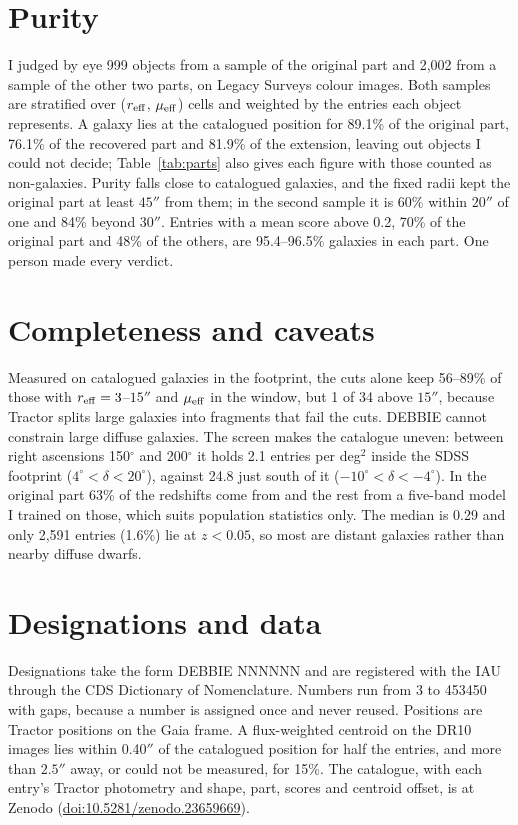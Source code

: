 \documentclass{aastex701}
\begin{document}
\section{Purity}

I judged by eye 999 objects from a sample of the original part and
2,002 from a sample of the other two parts, on Legacy Surveys colour images. Both samples are stratified over
($r_{\rm eff}$, $\mu_{\rm eff}$) cells and weighted by the entries each object
represents. A galaxy lies at the catalogued position for 89.1\% of the
original part, 76.1\% of the recovered part and 81.9\% of the
extension, leaving out objects I could not decide; Table~\ref{tab:parts} also
gives each figure with those counted as non-galaxies. Purity falls close to
catalogued galaxies, and the fixed radii kept the original part at least $45''$
from them; in the second sample it is 60\% within $20''$ of one and
84\% beyond $30''$.
Entries with a mean score above 0.2, 70\% of the original part and
48\% of the others, are 95.4--96.5\% galaxies in each part. One
person made every verdict.

\section{Completeness and caveats}

Measured on catalogued galaxies in the footprint, the cuts alone keep
56--89\% of those with $r_{\rm eff} = 3$--$15''$ and
$\mu_{\rm eff}$ in the window, but 1 of 34 above $15''$,
because Tractor splits large galaxies into fragments that fail the cuts. DEBBIE
cannot constrain large diffuse galaxies. The screen makes the catalogue uneven:
between right ascensions 150$^\circ$ and 200$^\circ$ it holds 2.1 entries
per deg$^2$ inside the SDSS footprint ($4^\circ < \delta < 20^\circ$), against
24.8 just south of it ($-10^\circ < \delta < -4^\circ$). In the original
part 63\% of the redshifts come from \citet{duncan2022} and the rest
from a five-band model I trained on those, which suits population statistics
only. The median is 0.29 and only 2,591 entries (1.6\%) lie
at $z < 0.05$, so most are distant galaxies rather than nearby diffuse dwarfs.

\section{Designations and data}

Designations take the form DEBBIE NNNNNN and are registered with the IAU
through the CDS Dictionary of Nomenclature. Numbers run from 3 to 453450
with gaps, because a number is assigned once and never reused. Positions are
Tractor positions on the Gaia frame. A flux-weighted centroid on the DR10 images
lies within 0.40$''$ of the catalogued position for half the entries, and
more than $2.5''$ away, or could not be measured, for 15\%. The
catalogue, with each entry's Tractor photometry and shape, part, scores and
centroid offset, is at Zenodo (\href{https://doi.org/10.5281/zenodo.23659669}{doi:10.5281/zenodo.23659669}).
\end{document}
